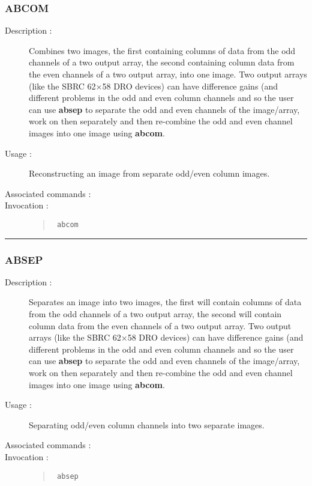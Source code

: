 \subsubsection*{\label{ABCOM}ABCOM}
\begin{description}

\item[Description :] Combines two images, the first containing columns
of data from the odd channels of a two output array, the second
containing column data from the even channels of a two output array,
into one image. Two output arrays (like the SBRC 62$\times$58 DRO
devices) can have difference gains (and different problems in the odd
and even column channels and so the user can use {\bf absep} to
separate the odd and even channels of the image/array, work on then
separately and then re-combine the odd and even channel images into one
image using {\bf abcom}.

\item[Usage :] Reconstructing an image from separate odd/even column images.

\item[Associated commands :] {\tt {}}

\item[Invocation :]
\begin{quote}{\tt 
abcom}
\end{quote}

\end{description}

\hrule 
\subsubsection*{\label{ABSEP}ABSEP}

\begin{description}

\item[Description :] Separates an image into two images, the first will
contain columns of data from the odd channels of a two output array,
the second will contain column data from the even channels of a two
output array.  Two output arrays (like the SBRC 62$\times$58 DRO
devices) can have difference gains (and different problems in the odd
and even column channels and so the user can use {\bf absep} to
separate the odd and even channels of the image/array, work on then
separately and then re-combine the odd and even channel images into one
image using {\bf abcom}.

\item[Usage :] Separating odd/even column channels into two separate images.

\item[Associated commands :] {\tt {}}

\item[Invocation :]
\begin{quote}{\tt 
absep}
\end{quote}

\end{description}

